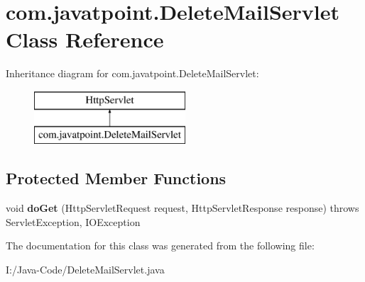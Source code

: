\hypertarget{classcom_1_1javatpoint_1_1_delete_mail_servlet}{}\section{com.\+javatpoint.\+Delete\+Mail\+Servlet Class Reference}
\label{classcom_1_1javatpoint_1_1_delete_mail_servlet}
Inheritance diagram for com.\+javatpoint.\+Delete\+Mail\+Servlet\+:\begin{figure}[H]
\begin{center}
\leavevmode
\includegraphics[height=2.000000cm]{classcom_1_1javatpoint_1_1_delete_mail_servlet}
\end{center}
\end{figure}
\subsection*{Protected Member Functions}
\begin{DoxyCompactItemize}
\item 
\mbox{\label{classcom_1_1javatpoint_1_1_delete_mail_servlet_ad03fda645aac872537eb9f9418b44623}} 
void {\bfseries do\+Get} (Http\+Servlet\+Request request, Http\+Servlet\+Response response)  throws Servlet\+Exception, I\+O\+Exception 
\end{DoxyCompactItemize}


The documentation for this class was generated from the following file\+:\begin{DoxyCompactItemize}
\item 
I\+:/\+Java-\/\+Code/Delete\+Mail\+Servlet.\+java\end{DoxyCompactItemize}
